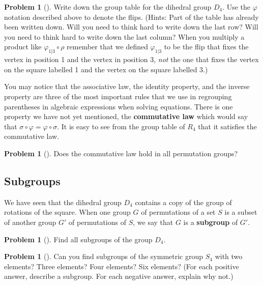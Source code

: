\documentclass[10pt,]{book}
\newcommand{\terminology}[1]{\textbf{#1}}
\theoremstyle{plain}
\theoremstyle{definition}
\newtheorem{activity}[project]{Problem}
\theoremstyle{definition}
\numberwithin{equation}{chapter}
\begin{document}
\begin{activity}[] \label{dihedral3}
Write down the group table for the dihedral group \(D_4\). Use the \(\varphi\) notation described above to denote the flips. (Hints: Part of the table has already been written down. Will you need to think hard to write down the last row? Will you need to think hard to write down the last column? When you multiply a product like \(\varphi_{1|3}
\circ \rho\) remember that we defined \(\varphi_{1|3}\) to be the flip that fixes the vertex in position 1 and the vertex in position 3, \emph{not} the one that fixes the vertex on the square labelled 1 and the vertex on the square labelled 3.)%
\end{activity}
You may notice that the associative law, the identity property, and the inverse property are three of the most important rules that we use in regrouping parentheses in algebraic expressions when solving equations. There is one property we have not yet mentioned, the \terminology{commutative law} which would say that \(\sigma\circ \varphi =
\varphi\circ\sigma\). It is easy to see from the group table of \(R_4\) that it satisfies the commutative law.%
\begin{activity}[]\marginsymbol[-1em]{} \label{activity-269}
Does the commutative law hold in all permutation groups?%
\end{activity}
\typeout{************************************************}
\typeout{************************************************}
\subsection[{Subgroups}]{Subgroups}\label{subsection-63}
We have seen that the dihedral group \(D_4\) contains a copy of the group of rotations of the square. When one group \(G\) of permutations of a set \(S\) is a subset of another group \(G'\) of permutations of \(S\), we say that \(G\) is a \terminology{subgroup} of \(G'\). %
\begin{activity}[] \label{S4}
Find all subgroups of the group \(D_4\).%
\end{activity}
\begin{activity}[]\marginsymbol[-1em]{} \label{activity-271}
Can you find subgroups of the symmetric group \(S_4\) with two elements? Three elements? Four elements? Six elements? (For each positive answer, describe a subgroup. For each negative answer, explain why not.)%
\end{activity}
\typeout{************************************************}
\typeout{************************************************}
\end{document}
